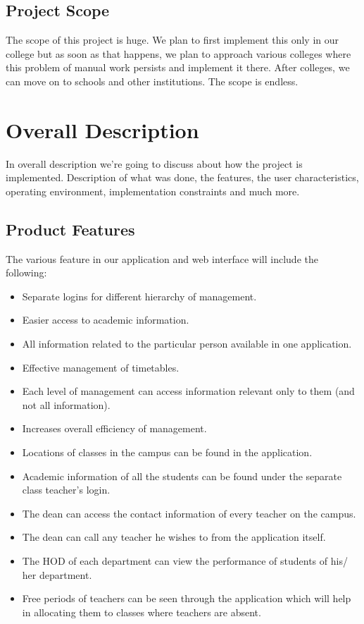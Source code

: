 \documentclass[BTech]{srmuthesis}
\begin{document}
\subsection{Project Scope}
The scope of this project is huge. We plan to first implement this only in our college but as soon as that happens, we plan to approach various colleges where this problem of manual work persists and implement it there. After colleges, we can move on to schools and other institutions. The scope is endless.  
\section{Overall Description}
In overall description we're going to discuss about how the project is implemented. Description of what was done, the features, the user characteristics, operating environment, implementation constraints and much more.
\subsection{Product Features}
The various feature in our application and web interface will include the following:
\begin{itemize}
\item Separate logins for different hierarchy of management.
\item Easier access to academic information.
\item All information related to the particular person available in one application.
\item Effective management of timetables.
\item Each level of management can access information relevant only to them (and not all information).
\item Increases overall efficiency of management.
\item Locations of classes in the campus can be found in the application.
\item Academic information of all the students can be found under the separate class teacher's login.
\item The dean can access the contact information of every teacher on the campus.
\item The dean can call any teacher he wishes to from the application itself.
\item The HOD of each department can view the performance of students of his/ her department.
\item Free periods of teachers can be seen through the application which will help in allocating them to classes where teachers are absent.
\end{itemize}
\end{document}
